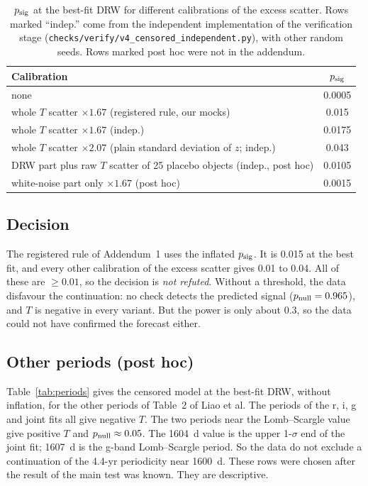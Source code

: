 \documentclass[11pt]{article}
\newcommand{\psig}{p_{\rm sig}}
\newcommand{\pnull}{p_{\rm null}}
\begin{document}
\begin{table}[t]
\centering
\caption{$\psig$ at the best-fit DRW for different calibrations of the excess scatter. Rows marked ``indep.'' come from the independent implementation of the verification stage (\texttt{checks/verify/v4\_censored\_independent.py}), with other random seeds. Rows marked post hoc were not in the addendum.}
\label{tab:calib}
\begin{tabular}{lc}
\toprule
Calibration & $\psig$ \\
\midrule
none & 0.0005 \\
whole $T$ scatter $\times 1.67$ (registered rule, our mocks) & 0.015 \\
whole $T$ scatter $\times 1.67$ (indep.) & 0.0175 \\
whole $T$ scatter $\times 2.07$ (plain standard deviation of $z$; indep.) & 0.043 \\
DRW part plus raw $T$ scatter of 25 placebo objects (indep., post hoc) & 0.0105 \\
white-noise part only $\times 1.67$ (post hoc) & 0.0015 \\
\bottomrule
\end{tabular}
\end{table}

\subsection{Decision}
The registered rule of Addendum~1 uses the inflated $\psig$. It is 0.015 at the best fit, and every other calibration of the excess scatter gives 0.01 to 0.04. All of these are $\ge 0.01$, so the decision is \emph{not refuted}. Without a threshold, the data disfavour the continuation: no check detects the predicted signal ($\pnull = 0.965$), and $T$ is negative in every variant. But the power is only about 0.3, so the data could not have confirmed the forecast either.

\subsection{Other periods (post hoc)}\label{sec:scope}
Table~\ref{tab:periods} gives the censored model at the best-fit DRW, without inflation, for the other periods of Table~2 of Liao et al. The periods of the r, i, g and joint fits all give negative $T$. The two periods near the Lomb--Scargle value give positive $T$ and $\pnull \approx 0.05$. The 1604~d value is the upper 1-$\sigma$ end of the joint fit; 1607~d is the g-band Lomb--Scargle period. So the data do not exclude a continuation of the 4.4-yr periodicity near 1600~d. These rows were chosen after the result of the main test was known. They are descriptive.
\end{document}
